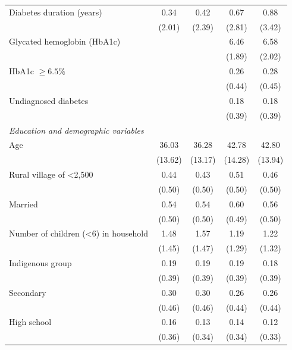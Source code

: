 \documentclass[12pt,english]{article}
\begin{document}
{\begin{table}[!ht]
\begin{center}
\begin{adjustbox}{max width=\textwidth}
{\begin{tabular}{l*{4}{c}}
Diabetes duration (years)   &        0.34&        0.42&        0.67&        0.88\\
                    &      (2.01)&      (2.39)&      (2.81)&      (3.42)\\
Glycated hemoglobin (HbA1c)&            &            &        6.46&        6.58\\
                    &            &            &      (1.89)&      (2.02)\\
HbA1c $\geq 6.5\%$  &            &            &        0.26&        0.28\\
                    &            &            &      (0.44)&      (0.45)\\
Undiagnosed diabetes&            &            &        0.18&        0.18\\
                    &            &            &      (0.39)&      (0.39)\\
\hspace*{10mm}\emph{Education and demographic variables}&&&& \\
Age                 &       36.03&       36.28&       42.78&       42.80\\
                    &     (13.62)&     (13.17)&     (14.28)&     (13.94)\\
Rural village of <2,500&        0.44&        0.43&        0.51&        0.46\\
                    &      (0.50)&      (0.50)&      (0.50)&      (0.50)\\
Married             &        0.54&        0.54&        0.60&        0.56\\
                    &      (0.50)&      (0.50)&      (0.49)&      (0.50)\\
Number of children (<6) in household&        1.48&        1.57&        1.19&        1.22\\
                    &      (1.45)&      (1.47)&      (1.29)&      (1.32)\\
Indigenous group    &        0.19&        0.19&        0.19&        0.18\\
                    &      (0.39)&      (0.39)&      (0.39)&      (0.39)\\
Secondary           &        0.30&        0.30&        0.26&        0.26\\
                    &      (0.46)&      (0.46)&      (0.44)&      (0.44)\\
High school         &        0.16&        0.13&        0.14&        0.12\\
                    &      (0.36)&      (0.34)&      (0.34)&      (0.33)\\

\end{tabular}}
\end{adjustbox}
\end{center}
\end{table}}
\end{document}
